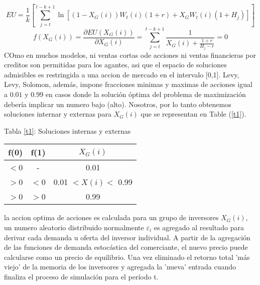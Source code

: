\documentclass[12pt,a4paper]{article}
\begin{document}
\begin{equation}
EU = \frac{1}{k}\left[ \sum^{t-k+1}_{j=t}\ln[(1-X_{G}(i))W_t(i)(1+r)+X_GW_t(i)(1+H_j)]\right]
\end{equation}
\begin{equation}
f(X_G(i))=\frac{\partial EU(X_G(i))}{\partial X_G(i)}= \sum^{t-k+1}_{j=t}\frac{1}{X_G(i)+\frac{1+r}{H_j-r}}=0
\end{equation}
\quad COmo en muchos modelos, ni ventas cortas ode acciones ni ventas financieras por creditos son permitidas para los agantes, asi que el espacio de soluciones admisibles es restringida a una accion de mercado en el intervalo [0,1]. Levy, Levy, Solomon, además, impone fracciones minimas y maximas de acciones igual a $0.01$ y $0.99$ en casos donde la solución óptima del problema de maximización debería implicar un numero bajo (alto). Nosotros, por lo tanto obtenemos soluciones internar y externas para $X_G(i)$ que se representan en Table (\ref{t1}).
\begin{center}
Tabla \ref{t1}: Soluciones internas y externas\\
\begin{tabular}{ccc}
\hline
f(0)&f(1)& $X_G(i)$\\
\hline
$<$0&-&0.01\\
\hline
$>$0&$<$0&0.01 $< X(i) <$ 0.99\\
\hline
$>$0&$>$0&0.99
\end{tabular}
\label{t1}
\end{center}
\quad la accion optima de acciones es calculada para un grupo de inversores $X_G(i)$, un numero aleatorio distribuido normalmente $\varepsilon_i$ es agregado al resultado para derivar cada demanda u oferta del inversor individual. A partir de la agregación de las funciones de demanda estocástica del comerciante, el nuevo precio puede calcularse como un precio de equilibrio. Una vez eliminado el retorno total 'más viejo' de la memoria de los inversores y agregada la 'nueva' entrada cuando finaliza el proceso de simulación para el período t.  
\end{document}

